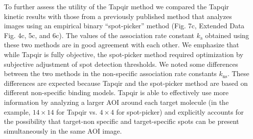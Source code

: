 To further assess the utility of the Tapqir method we compared the Tapqir kinetic results with those from a previously published method that analyzes images using an empirical binary ``spot-picker'' method \cite{Friedman2006-kb} (Fig. 7c, Extended Data Fig. 4c, 5c, and 6c). The values of the association rate constant $k_\mathrm{a}$ obtained using these two methods are in good agreement with each other. We emphasize that while Tapqir is fully objective, the spot-picker method required optimization by subjective adjustment of spot detection thresholds.  We noted some differences between the two methods in the non-specific association rate constants $k_\mathrm{ns}$. These differences are expected because Tapqir and the spot-picker method are based on different non-specific binding models.  Tapqir is able to effectively use more information by analyzing a larger AOI around each target molecule (in the example, $14 \times 14$ for Tapqir vs. $4 \times 4$ for spot-picker) and explicitly accounts for the possibility that target-non specific and target-specific spots can be present simultaneously in the same AOI image.  
